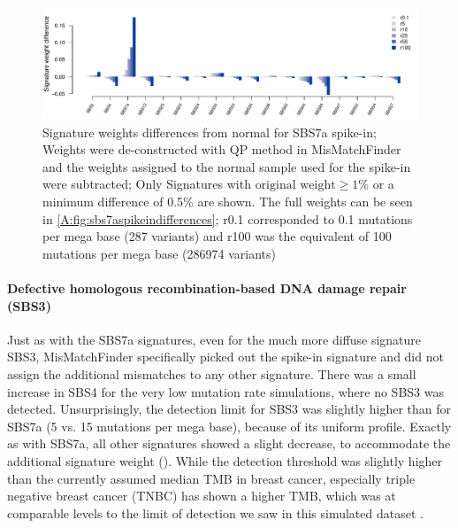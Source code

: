 \begin{figure}[ht]
\centering
\includegraphics[width=.99\linewidth]{Figures/MisMatchFinder/SBS7SpikeInSignatureDifferencesFocussed.pdf}
\caption[Signature weights differences from normal for SBS7a spike-in]{Signature weights differences from normal for SBS7a spike-in; Weights were de-constructed with QP method in MisMatchFinder and the weights assigned to the normal sample used for the spike-in were subtracted; Only Signatures with $\text{original weight}\geq 1\%$ or a minimum difference of 0.5\% are shown. The full weights can be seen in \protect\autoref{A:fig:sbs7aspikeindifferences}; r0.1 corresponded to 0.1 mutations per mega base (287 variants) and r100 was the equivalent of 100 mutations per mega base (286974 variants)}\label{fig:mmf-spikeSBS7asignatures}
\end{figure}

\paragraph{Defective homologous recombination-based DNA damage repair (SBS3)}
\label{mmf-sec:mbcSim}

Just as with the SBS7a signatures, even for the much more diffuse signature SBS3, MisMatchFinder specifically picked out the spike-in signature and did not assign the additional mismatches to any other signature. There was a small increase in SBS4 for the very low mutation rate simulations, where no SBS3 was detected. Unsurprisingly, the detection limit for SBS3 was slightly higher than for SBS7a (5 vs. 15 mutations per mega base), because of its uniform profile. Exactly as with SBS7a, all other signatures showed a slight decrease, to accommodate the additional signature weight (). While the detection threshold was slightly higher than the currently assumed median TMB in breast cancer, especially triple negative breast cancer (TNBC) has shown a higher TMB, which was at comparable levels to the limit of detection we saw in this simulated dataset \cite{BarrosoSousa2020}.

